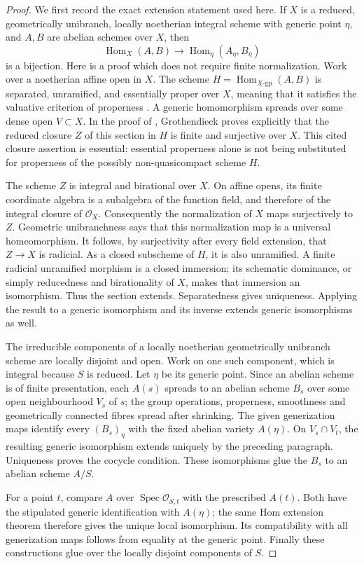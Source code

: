 \begin{proof}
We first record the exact extension statement used here. If $X$ is a
reduced, geometrically unibranch, locally noetherian integral scheme
with generic point $\eta$,
and $A,B$ are abelian schemes over $X$, then
\[
 \operatorname{Hom}_X(A,B)\longrightarrow
 \operatorname{Hom}_\eta(A_\eta,B_\eta)
\]
is a bijection. Here is a proof which does not require finite
normalization. Work over a noetherian affine open in $X$. The scheme
$H=\operatorname{Hom}_{X\text{-}\mathrm{gp}}(A,B)$ is separated,
unramified, and essentially proper over $X$, meaning that it satisfies
the valuative criterion of properness
\cite[p.64]{Grothendieck1966Hom}. A generic homomorphism spreads over
some dense open $V\subset X$. In the proof of
\cite[Lemma~1.2.1, p.65]{Grothendieck1966Hom}, Grothendieck proves
explicitly that the reduced closure $Z$ of this section in $H$ is
finite and surjective over $X$. This cited closure assertion is
essential: essential properness alone is not being substituted for
properness of the possibly non-quasicompact scheme $H$.

The scheme $Z$ is integral and birational over $X$. On affine opens,
its finite coordinate algebra is a subalgebra of the function field,
and therefore of the integral closure of $\mathcal O_X$. Consequently
the normalization of $X$ maps surjectively to $Z$. Geometric
unibranchness says that this normalization map is a universal
homeomorphism. It follows, by surjectivity after every field extension,
that $Z\to X$ is radicial. As a closed subscheme of $H$, it is also
unramified. A finite radicial unramified morphism is a closed immersion;
its schematic dominance, or simply reducedness and birationality of
$X$, makes that immersion an isomorphism. Thus the section extends.
Separatedness gives uniqueness. Applying the result to a generic
isomorphism and its inverse extends generic isomorphisms as well.

The irreducible components of a locally noetherian geometrically
unibranch scheme are locally disjoint and open. Work on one such
component, which is integral because $S$ is reduced.
Let $\eta$ be its generic point. Since an abelian scheme is of finite
presentation, each $A(s)$ spreads to an abelian scheme $B_s$ over
some open neighbourhood $V_s$ of $s$; the group operations, properness,
smoothness and geometrically connected fibres spread after shrinking.
The given generization maps identify every $(B_s)_\eta$ with the
fixed abelian variety $A(\eta)$. On $V_s\cap V_t$, the resulting
generic isomorphism extends uniquely by the preceding paragraph.
Uniqueness proves the cocycle condition. These isomorphisms glue the
$B_s$ to an abelian scheme $A/S$.

For a point $t$, compare $A$ over $\operatorname{Spec}\mathcal O_{S,t}$
with the prescribed $A(t)$. Both have the stipulated generic
identification with $A(\eta)$; the same Hom extension theorem
therefore gives the unique local isomorphism. Its compatibility with
all generization maps follows from equality at the generic point.
Finally these constructions glue over the locally disjoint components
of $S$.
\end{proof}

